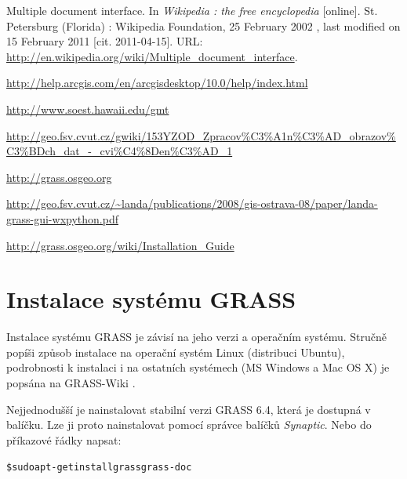 \documentclass[a4paper,12pt,draft]{article}
\begin{document}
{\begin{thebibliography}{9}
Multiple document interface. In \emph{Wikipedia : the free encyclopedia}
[online]. St. Petersburg (Florida) : Wikipedia Foundation, 25 February 2002 ,
last modified on 15 February 2011 [cit. 2011-04-15]. URL:
\url{http://en.wikipedia.org/wiki/Multiple_document_interface}.

\url{http://help.arcgis.com/en/arcgisdesktop/10.0/help/index.html}

\url{http://www.soest.hawaii.edu/gmt}

 \url{http://geo.fsv.cvut.cz/gwiki/153YZOD_Zpracov%C3%A1n%C3%AD_obrazov%C3%BDch_dat_-_cvi%C4%8Den%C3%AD_1}

\url{http://grass.osgeo.org}

\url{http://geo.fsv.cvut.cz/~landa/publications/2008/gis-ostrava-08/paper/landa-grass-gui-wxpython.pdf}
%

\url{http://grass.osgeo.org/wiki/Installation_Guide}



\end{thebibliography}


\appendix
\section{Instalace systému GRASS}
\label{priloha:instalace}
Instalace systému GRASS je závisí na jeho verzi a operačním
systému. Stručně popíši způsob instalace na operační systém Linux
(distribuci Ubuntu), podrobnosti k instalaci i na ostatních systémech
(MS Windows a Mac OS X) je popsána na GRASS-Wiki \cite{instalace}.

Nejjednodušší je nainstalovat stabilní verzi GRASS 6.4, která je
dostupná v balíčku. Lze ji proto nainstalovat pomocí správce balíčků
\emph{Synaptic}. Nebo do příkazové řádky napsat:
\begin{alltt}
{\footnotesize \$ sudo apt-get install grass grass-doc}
\end{alltt}

}
\end{document}
